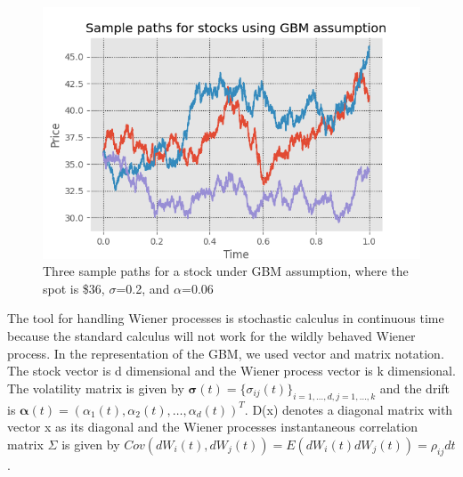 \begin{figure}[th]
\centering
\includegraphics{Figures/samplePath.png}
\decoRule
\caption[Sample Path for Stocks]{Three sample paths for a stock under GBM assumption, where the spot is \$36, $\sigma$=0.2, and $\alpha$=0.06}
\label{fig:BM}
\end{figure}

The tool for handling Wiener processes is stochastic calculus in continuous time because the standard calculus will not work for the wildly behaved Wiener process. In the representation of the GBM, we used vector and matrix notation. The stock vector is d dimensional and the Wiener process vector is k dimensional. The volatility matrix is given by $\bm{\sigma}(t)=\{\sigma_{ij}(t)\}_{i=1,\ldots,d,j=1,\ldots,k}$ and the drift is $\bm{\alpha}(t)=(\alpha_1(t), \alpha_2(t), \ldots, \alpha_d(t))^T$. D(x) denotes a diagonal matrix with vector x as its diagonal and the Wiener processes instantaneous correlation matrix $\Sigma$ is given by $Cov(dW_i(t),dW_j(t))=E(dW_i(t)dW_j(t))=\rho_{ij}dt$.

